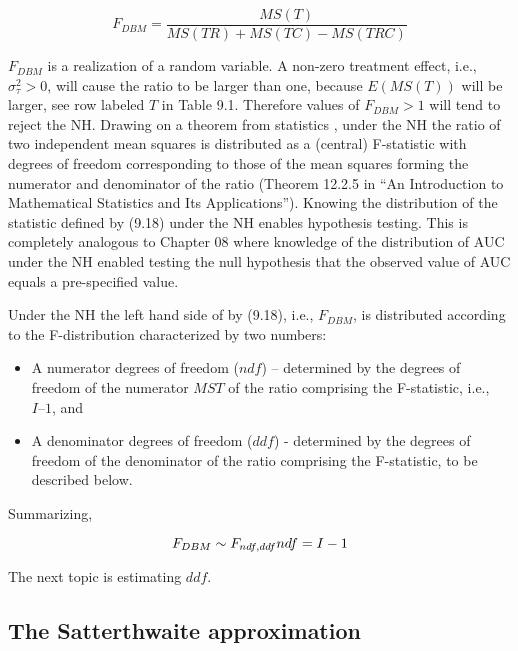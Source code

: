 \documentclass[
]{book}
\providecommand{\tightlist}{%
  \setlength{\itemsep}{0pt}\setlength{\parskip}{0pt}}
\begin{document}
\begin{equation}
F_{DBM} = \frac{MS(T)}{MS(TR) + MS(TC) - MS(TRC)}
\label{eq:FStatRRRC}
\end{equation}

\(F_{DBM}\) is a realization of a random variable. A non-zero treatment effect, i.e., \(\sigma_{\tau}^{2} > 0\), will cause the ratio to be larger than one, because \(E\left ( MS(T) \right)\) will be larger, see row labeled \(T\) in Table 9.1. Therefore values of \(F_{DBM} > 1\) will tend to reject the NH. Drawing on a theorem from statistics \citep{RN1492}, under the NH the ratio of two independent mean squares is distributed as a (central) F-statistic with degrees of freedom corresponding to those of the mean squares forming the numerator and denominator of the ratio (Theorem 12.2.5 in ``An Introduction to Mathematical Statistics and Its Applications''). Knowing the distribution of the statistic defined by (9.18) under the NH enables hypothesis testing. This is completely analogous to Chapter 08 where knowledge of the distribution of AUC under the NH enabled testing the null hypothesis that the observed value of AUC equals a pre-specified value.

Under the NH the left hand side of by (9.18), i.e., \(F_{DBM}\), is distributed according to the F-distribution characterized by two numbers:

\begin{itemize}
\tightlist
\item
  A numerator degrees of freedom (\(ndf\)) -- determined by the degrees of freedom of the numerator \(MST\) of the ratio comprising the F-statistic, i.e., \(I – 1\), and
\item
  A denominator degrees of freedom (\(ddf\)) - determined by the degrees of freedom of the denominator of the ratio comprising the F-statistic, to be described below.
\end{itemize}

Summarizing,

\begin{equation}
F_{DBM} \sim F_{ndf,ddf} \\
ndf=I-1
\label{eq:samplingFStat}
\end{equation}

The next topic is estimating \(ddf\).

\hypertarget{the-satterthwaite-approximation}{%
\subsection{The Satterthwaite approximation}\label{the-satterthwaite-approximation}}
\end{document}
